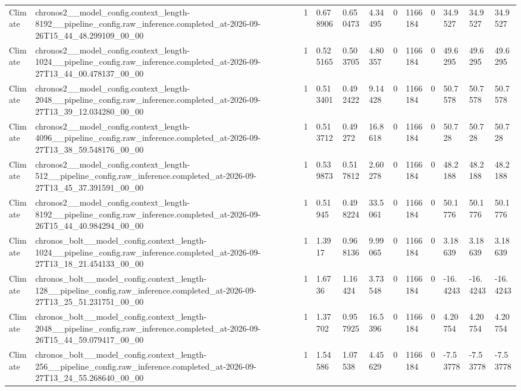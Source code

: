 \begin{tabular}{llllllllllll}
Climate & chronos2\_\_model\_config.context\_length-8192\_\_pipeline\_config.raw\_inference.completed\_at-2026-09-26T15\_44\_48.299109\_00\_00 & 1 & 0.678906 & 0.650473 & 4.34495 & 0 & 1166184 & 0 & 34.9527 & 34.9527 & 34.9527 \\
Climate & chronos2\_\_model\_config.context\_length-1024\_\_pipeline\_config.raw\_inference.completed\_at-2026-09-27T13\_44\_00.478137\_00\_00 & 1 & 0.525165 & 0.503705 & 4.80357 & 0 & 1166184 & 0 & 49.6295 & 49.6295 & 49.6295 \\
Climate & chronos2\_\_model\_config.context\_length-2048\_\_pipeline\_config.raw\_inference.completed\_at-2026-09-27T13\_39\_12.034280\_00\_00 & 1 & 0.513401 & 0.492422 & 9.14428 & 0 & 1166184 & 0 & 50.7578 & 50.7578 & 50.7578 \\
Climate & chronos2\_\_model\_config.context\_length-4096\_\_pipeline\_config.raw\_inference.completed\_at-2026-09-27T13\_38\_59.548176\_00\_00 & 1 & 0.513712 & 0.49272 & 16.8618 & 0 & 1166184 & 0 & 50.728 & 50.728 & 50.728 \\
Climate & chronos2\_\_model\_config.context\_length-512\_\_pipeline\_config.raw\_inference.completed\_at-2026-09-27T13\_45\_37.391591\_00\_00 & 1 & 0.539873 & 0.517812 & 2.60278 & 0 & 1166184 & 0 & 48.2188 & 48.2188 & 48.2188 \\
Climate & chronos2\_\_model\_config.context\_length-8192\_\_pipeline\_config.raw\_inference.completed\_at-2026-09-26T15\_44\_40.984294\_00\_00 & 1 & 0.51945 & 0.498224 & 33.5061 & 0 & 1166184 & 0 & 50.1776 & 50.1776 & 50.1776 \\
Climate & chronos\_bolt\_\_model\_config.context\_length-1024\_\_pipeline\_config.raw\_inference.completed\_at-2026-09-27T13\_18\_21.454133\_00\_00 & 1 & 1.3917 & 0.968136 & 9.99065 & 0 & 1166184 & 0 & 3.18639 & 3.18639 & 3.18639 \\
Climate & chronos\_bolt\_\_model\_config.context\_length-128\_\_pipeline\_config.raw\_inference.completed\_at-2026-09-27T13\_25\_51.231751\_00\_00 & 1 & 1.6736 & 1.16424 & 3.73548 & 0 & 1166184 & 0 & -16.4243 & -16.4243 & -16.4243 \\
Climate & chronos\_bolt\_\_model\_config.context\_length-2048\_\_pipeline\_config.raw\_inference.completed\_at-2026-09-26T15\_44\_59.079417\_00\_00 & 1 & 1.37702 & 0.957925 & 16.5396 & 0 & 1166184 & 0 & 4.20754 & 4.20754 & 4.20754 \\
Climate & chronos\_bolt\_\_model\_config.context\_length-256\_\_pipeline\_config.raw\_inference.completed\_at-2026-09-27T13\_24\_55.268640\_00\_00 & 1 & 1.54586 & 1.07538 & 4.45629 & 0 & 1166184 & 0 & -7.53778 & -7.53778 & -7.53778 \\

\end{tabular}
